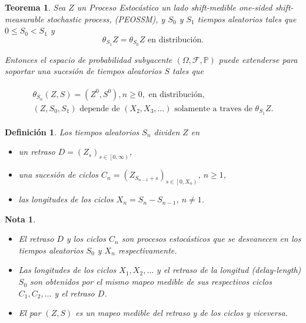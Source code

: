 \documentclass{article}
\newtheorem{Def}{Definición}[section]
\newtheorem{Teo}{Teorema}%
\newtheorem{Note}{Nota}%
\newcommand{\prob}{\mathbb{P}}
\numberwithin{equation}{section}
\begin{document}
\begin{Teo}
Sea $Z$ un Proceso Estoc\'astico un lado shift-medible \textit{one-sided shift-measurable stochastic process}, (PEOSSM), y $S_{0}$ y $S_{1}$ tiempos aleatorios tales que $0\leq S_{0}<S_{1}$ y
\begin{equation}
\theta_{S_{1}}Z=\theta_{S_{0}}Z\textrm{ en distribuci\'on}.
\end{equation}

Entonces el espacio de probabilidad subyacente $\left(\Omega,\mathcal{F},\prob\right)$ puede extenderse para soportar una sucesi\'on de tiempos aleatorios $S$ tales que

\begin{eqnarray}
\begin{array}{l}
\theta_{S_{n}}\left(Z,S\right)=\left(Z^{0},S^{0}\right),n\geq0,\textrm{ en distribuci\'on},\\
\left(Z,S_{0},S_{1}\right)\textrm{ depende de }\left(X_{2},X_{3},\ldots\right)\textrm{ solamente a traves de }\theta_{S_{1}}Z.
\end{array}
\end{eqnarray}
\end{Teo}

\begin{Def}
Los tiempos aleatorios $S_{n}$ dividen $Z$ en 
\begin{itemize}
\item[a)] un retraso $D=\left(Z_{s}\right)_{s\in\left[0,\infty\right)}$,
\item[b)] una sucesi\'on de ciclos $C_{n}=\left(Z_{S_{n-1}+s}\right)_{ s\in\left[0,X_{n}\right)}$, $n\geq1$,
\item[c)] las longitudes de los ciclos $X_{n}=S_{n}-S_{n-1}$, $n\neq1$.
\end{itemize}
\end{Def}

\begin{Note}
\begin{itemize}
\item[a)] El retraso $D$ y los ciclos $C_{n}$ son procesos estoc\'asticos que se desvanecen en los tiempos aleatorios $S_{0}$ y $X_{n}$ respectivamente.
\item[b)] Las longitudes de los ciclos $X_{1},X_{2},\ldots$ y el retraso de la longitud (\textit{delay-length}) $S_{0}$ son obtenidos por el mismo mapeo medible de sus respectivos ciclos $C_{1},C_{2},\ldots$ y el retraso $D$. 
\item[c)] El par $\left(Z,S\right)$ es un mapeo medible del retraso y de los ciclos y viceversa.
\end{itemize}
\end{Note}
\end{document}
